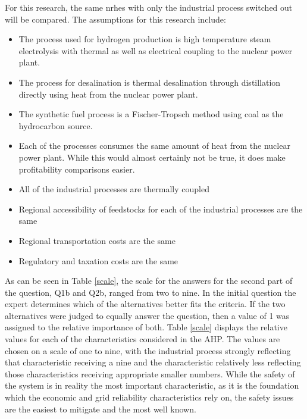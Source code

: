  For this research, the same \ac{nrhes} with only the industrial process switched out will be compared. The assumptions for this research include:
\begin{itemize}
\item The process used for hydrogen production is high temperature steam electrolysis with thermal as well as electrical coupling to the nuclear power plant.
\item  The process for desalination is thermal desalination through distillation directly using heat from the nuclear power plant.
\item The synthetic fuel process is a Fischer-Tropsch method using coal as the hydrocarbon source.
\item Each of the processes consumes the same amount of heat from the nuclear power plant. While this would almost certainly not be true, it does make profitability comparisons easier.
\item All of the industrial processes are thermally coupled
\item Regional accessibility of feedstocks for each of the industrial processes are the same
\item Regional transportation costs are the same
\item Regulatory and taxation costs are the same
\end{itemize}

As can be seen in Table \ref{scale}, the scale for the answers for the second part of the question, Q1b and Q2b, ranged from two to  nine.  In the initial question the expert determines which of the alternatives better fits the criteria.  If the two alternatives were judged to equally answer the question, then a value of 1 was assigned to the relative importance of both. Table \ref{scale} displays the relative values for each of the characteristics considered in the AHP. The values are chosen on a scale of one to nine, with the industrial process strongly reflecting that characteristic receiving a nine and the characteristic relatively less reflecting those characteristics receiving appropriate smaller numbers. While the safety of the system is in reality the most important characteristic, as it is the foundation which the economic and grid reliability characteristics rely on, the safety issues are the easiest to mitigate and the most well known.

